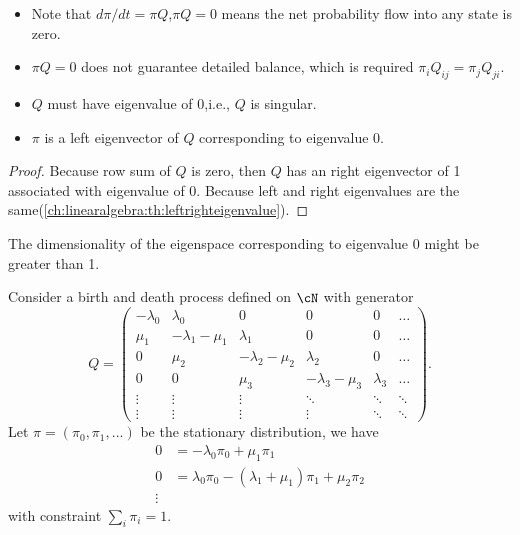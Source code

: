 \begin{refsection}
\begin{remark}\hfill
\begin{itemize}
	\item Note that $d\pi/dt = \pi Q$,$\pi Q =0$ means the net probability flow into any state is zero.
	\item $\pi Q =0$ does not guarantee detailed balance, which is required $\pi_iQ_{ij} = \pi_j Q_{ji}$. 
\end{itemize}
\end{remark}



\begin{lemma}\hfill
\begin{itemize}
	\item $Q$ must have eigenvalue of 0,i.e., $Q$ is singular.
	\item $\pi$ is a left eigenvector of $Q$ corresponding to eigenvalue 0.
\end{itemize}
\end{lemma}
\begin{proof}
Because row sum of $Q$ is zero, then $Q$ has an right eigenvector of 1 associated with eigenvalue of 0. Because left and right eigenvalues are the same(\autoref{ch:linearalgebra:th:leftrighteigenvalue}).
\end{proof}



\begin{remark}
The dimensionality of the eigenspace corresponding to eigenvalue 0 might be greater than 1.  
\end{remark}

\begin{example}
Consider a birth and death process defined on $\cN$ with generator
	$$Q=\begin{pmatrix}
	-\lambda_0 & \lambda_0 & 0 & 0 & 0 & \dots \\ 
	\mu_1 & -\lambda_1-\mu_1 & \lambda_1 & 0 & 0 & \dots\\ 
	0 & \mu_2 & -\lambda_2-\mu_2 & \lambda_2 & 0 & \dots\\ 
	0 & 0 & \mu_3 & -\lambda_3-\mu_3  & \lambda_3 & \dots\\ 
	\vdots & \vdots & \vdots  & \ddots & \ddots & \ddots\\ 
	\vdots & \vdots  & \vdots &\vdots  & \ddots & \ddots
	\end{pmatrix}.$$
Let $\pi = (\pi_0,\pi_1,...)$ be the stationary distribution, we have
\begin{align*}
0 &= -\lambda_0\pi_0 + \mu_1\pi_1 \\
0 &= \lambda_0\pi_0 -(\lambda_1+\mu_1)\pi_1 + \mu_2\pi_2 \\
\vdots
\end{align*}
with constraint $\sum_i \pi_i = 1$.
\end{example}



\end{refsection}

